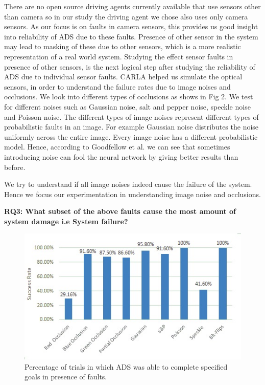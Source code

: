 There are no open source driving agents currently available that use sensors other than camera so in our study the driving agent we chose also uses only camera sensors. As our focus is on faults in camera sensors, this provides us good insight into reliability of ADS due to these faults. Presence of other sensor in the system may lead to masking of these due to other sensors, which is a more realistic representation of a real world system. Studying the effect sensor faults in presence of other sensors, is the next logical step after studying the reliability of ADS due to individual sensor faults.  
CARLA helped us simulate the optical sensors, in order to understand the failure rates due to image noises and occlusions. We look into different types of occlusions as shows in Fig 2. We test for different noises such as Gaussian noise, salt and pepper noise, speckle noise and Poisson noise. The different types of image noises represent different types of probabilistic faults in an image. For example Gaussian noise distributes the noise uniformly across the entire image. Every image noise has a different probabilistic model. Hence, according to Goodfellow et al.\cite{2014arXiv1412.6572G} we can see that sometimes introducing noise can fool the neural network by giving better results than before. 

We try to understand if all image noises indeed cause the failure of the system. Hence we focus our experimentation in understanding image noise and occlusions.

\textbf{RQ3: What subset of the above faults cause the most amount of system damage i.e System failure?}

\begin{figure}
	\vspace{-0.5em}
	\centering
	\includegraphics[scale=0.7]{success_rate}
	\vspace{-0.5em}
	\caption{Percentage of trials in which ADS was able to complete specified goals in presence of faults.}
	\label{fig:success_rate}
	\vspace{-1.5em}
\end{figure}

